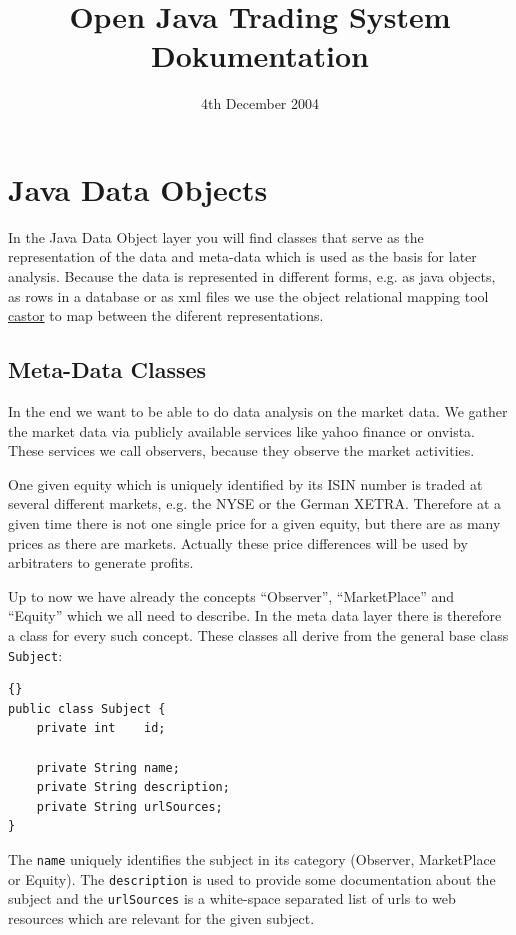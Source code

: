 \documentclass[a4paper,fleqn]{article}
\title{Open Java Trading System\\
\Large Dokumentation
}
\author{\ahref{mailto:Christian dot Schuhegger at gmx dot de}{Christian Schuhegger}}
\date{4th December 2004}
\begin{document}
\maketitle

%
\tableofcontents

\lstset{commentstyle=\textit, stringstyle=\upshape,showspaces=false}
\lstset{language=java}
\section{Java Data Objects}

\noindent In the Java Data Object layer you will find classes that
serve as the representation of the data and meta-data which is
used as the basis for later analysis. Because the data is represented
in different forms, e.g. as java objects, as rows in a database or as
xml files we use the object relational mapping tool
\href{http://www.castor.org/}{castor} to map between the diferent
representations.

\subsection{Meta-Data Classes}

\noindent In the end we want to be able to do data analysis on the
market data. We gather the market data via publicly available services
like yahoo finance or onvista. These services we call observers,
because they observe the market activities. 

One given equity which is uniquely identified by its ISIN number is
traded at several different markets, e.g. the NYSE or the German
XETRA. Therefore at a given time there is not one single price for a
given equity, but there are as many prices as there are
markets. Actually these price differences will be used by arbitraters
to generate profits.

Up to now we have already the concepts ``Observer'', ``MarketPlace'' and
``Equity'' which we all need to describe. In the meta data layer there
is therefore a class for every such concept. These classes all derive
from the general base class \lstinline!Subject!:
\begin{lstlisting}[frame=trbl]{}
public class Subject {
	private int    id;
	
	private String name;
	private String description;
	private String urlSources;
}
\end{lstlisting}
The \lstinline!name! uniquely identifies the subject in its category (Observer,
MarketPlace or Equity). The \lstinline!description! is used to provide some documentation
about the subject and the \lstinline!urlSources! is a white-space
separated list of urls to web resources which are relevant for the
given subject.
\end{document}
